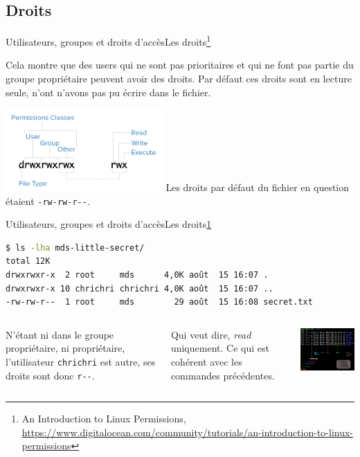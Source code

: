 \documentclass{beamer}
\begin{document}
    \subsection{Droits}\label{subsec:droits}

    \begin{frame}{Utilisateurs, groupes et droits d'accès}{Les droits\footnote{\label{rights-digitalocean}An Introduction to Linux Permissions, \url{https://www.digitalocean.com/community/tutorials/an-introduction-to-linux-permissions}}}
        \begin{dangercolorbox}
            Cela montre que des users qui ne sont pas prioritaires et qui ne font pas partie du groupe propriétaire peuvent avoir des droits.
            Par défaut ces droits sont en lecture seule, n'ont n'avons pas pu écrire dans le fichier.
        \end{dangercolorbox}
        \centering
        \includegraphics[width=6cm]{image/permission-classes}
        \flushleft
        Les droits par défaut du fichier en question étaient \lstinline{-rw-rw-r--}.
    \end{frame}

    \begin{frame}[fragile]{Utilisateurs, groupes et droits d'accès}{Les droits\cref{rights-digitalocean}}
        \begin{lstlisting}[language=bash]
$ ls -lha mds-little-secret/
total 12K
drwxrwxr-x  2 root     mds      4,0K août  15 16:07 .
drwxrwxr-x 10 chrichri chrichri 4,0K août  15 16:07 ..
-rw-rw-r--  1 root     mds        29 août  15 16:08 secret.txt
        \end{lstlisting}
        \begin{columns}
            N'étant ni dans le groupe propriétaire, ni propriétaire, l'utilisateur \lstinline{chrichri} est autre, ses droits sont donc \lstinline{r--}.

            Qui veut dire, \textit{read} uniquement.
            Ce qui est cohérent avec les commandes précédentes.
            \begin{center}
                \includegraphics[width=6.5cm]{image/ls-details}
            \end{center}
        \end{columns}
    \end{frame}
\end{document}
